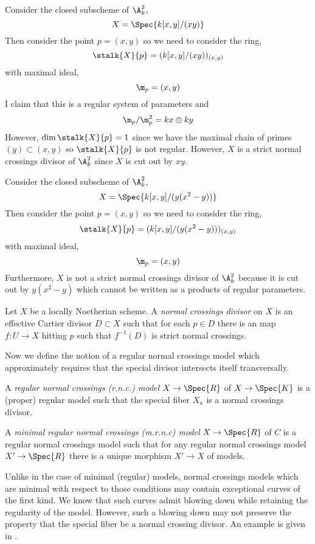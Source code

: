 \begin{example}
Consider the closed subscheme of $\A^2_k$,
\[ X = \Spec{k[x, y]/(xy)} \]
Then consider the point $p = (x, y)$ so we need to consider the ring,
\[ \stalk{X}{p} = (k[x, y]/(xy))_{(x, y)} \]
with maximal ideal,
\[ \m_p = (x, y) \]
I claim that this is a regular system of parameters and
\[ \m_p / \m_p^2 = k x \oplus k y \] 
However, $\dim{\stalk{X}{p}} = 1$ since we have the maximal chain of primes $(y) \subset (x, y)$ so $\stalk{X}{p}$ is not regular. However, $X$ is a strict normal crossings divisor of $\A^2_k$ since $X$ is cut out by $xy$. 
\end{example}

\begin{example}
Consider the closed subscheme of $\A^2_k$,
\[ X = \Spec{k[x, y]/(y(x^2 - y))} \]
Then consider the point $p = (x, y)$ so we need to consider the ring,
\[ \stalk{X}{p} = (k[x, y]/(y(x^2 - y)))_{(x, y)} \]
with maximal ideal,
\[ \m_p = (x, y) \]
Furthermore, $X$ is not a strict normal crossings divisor of $\A^2_k$ because it is cut out by $y (x^2 - y)$ which cannot be written as a products of regular parameters. 
\end{example}

\begin{defn}
Let $X$ be a locally Noetherian scheme. A \textit{normal crossings divisor} on $X$ is an effective Cartier divisor $D \subset X$ such that for each $p \in D$ there is an \etale map $f : U \to X$ hitting $p$ such that $f^{-1}(D)$ is strict normal crossings.
\end{defn}
\noindent
Now we define the notion of a regular normal crossings model which approximately requires that the special divisor intersects itself transversally. 

\begin{defn}
A \textit{regular normal crossings (r.n.c.) model} $X \to \Spec{R}$ of $X \to \Spec{K}$ is a (proper) regular model such that the special fiber $X_\kappa$ is a normal crossings divisor.
\end{defn}

\begin{defn}
A \textit{minimal regular normal crossings (m.r.n.c) model} $X \to \Spec{R}$ of $C$ is a regular normal crossings model such that for any regular normal crossings model $X' \to \Spec{R}$ there is a unique morphism $X' \to X$ of models.
\end{defn}

\begin{rmk}
Unlike in the case of minimal (regular) models, normal crossings models which are minimal with respect to those conditions may contain exceptional curves of the first kind. We know that such curves admit blowing down while retaining the regularity of the model. However, such a blowing down may not preserve the property that the special fiber be a normal crossing divisor. An example is given in \cite[Rmk. 3.16]{tim}.
\end{rmk}

